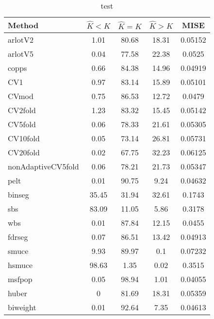\begin{table}[ht]
\centering
\begin{tabular}{l|cccc}
  \hline
Method & $\hat{K} < K$ & $\hat{K} = K$ & $\hat{K} > K$ & MISE \\ 
  \hline
arlotV2 &  1.01 & 80.68 & 18.31 & 0.05152 \\ 
  arlotV5 &  0.04 & 77.58 & 22.38 & 0.0525 \\ 
  copps &  0.66 & 84.38 & 14.96 & 0.04919 \\ 
  CV1 &  0.97 & 83.14 & 15.89 & 0.05101 \\ 
  CVmod &  0.75 & 86.53 & 12.72 & 0.0479 \\ 
  CV2fold &  1.23 & 83.32 & 15.45 & 0.05142 \\ 
  CV5fold &  0.06 & 78.33 & 21.61 & 0.05305 \\ 
  CV10fold &  0.05 & 73.14 & 26.81 & 0.05731 \\ 
  CV20fold &  0.02 & 67.75 & 32.23 & 0.06125 \\ 
  nonAdaptiveCV5fold &  0.06 & 78.21 & 21.73 & 0.05347 \\ 
  pelt &  0.01 & 90.75 &  9.24 & 0.04632 \\ 
  binseg & 35.45 & 31.94 & 32.61 & 0.1743 \\ 
  sbs & 83.09 & 11.05 &  5.86 & 0.3178 \\ 
  wbs &  0.01 & 87.84 & 12.15 & 0.0455 \\ 
  fdrseg &  0.07 & 86.51 & 13.42 & 0.04913 \\ 
  smuce &  9.93 & 89.97 &   0.1 & 0.07232 \\ 
  hsmuce & 98.63 &  1.35 &  0.02 & 0.3515 \\ 
  msfpop &  0.05 & 98.94 &  1.01 & 0.04055 \\ 
  huber &     0 & 81.69 & 18.31 & 0.05359 \\ 
  biweight &  0.01 & 92.64 &  7.35 & 0.04613 \\ 
   \hline
\end{tabular}
\caption{test} 
\end{table}
